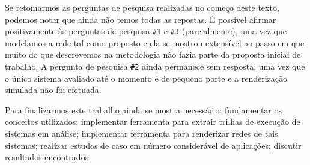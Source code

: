 Se retomarmos as perguntas de pesquisa realizadas no começo deste texto, podemos
notar que ainda não temos todas as repostas.
É possível afirmar positivamente às perguntas de pesquisa \texttt{\#1} e
\texttt{\#3} (parcialmente), uma vez que modelamos a rede tal como proposto e ela
se mostrou extensível ao passo em que muito do que descrevemos na metodologia
não fazia parte da proposta inicial de trabalho.
A pergunta de pesquisa \texttt{\#2} ainda permanece sem resposta, uma vez que o
único sistema avaliado até o momento é de pequeno porte e a renderização
simulada não foi efetuada.

Para finalizarmos este trabalho ainda se mostra necessário: fundamentar os
conceitos utilizados; implementar ferramenta para extrair trilhas de execução de
sistemas em análise; implementar ferramenta para renderizar redes de tais
sistemas; realizar estudos de caso em número considerável de aplicações; 
discutir resultados encontrados.

